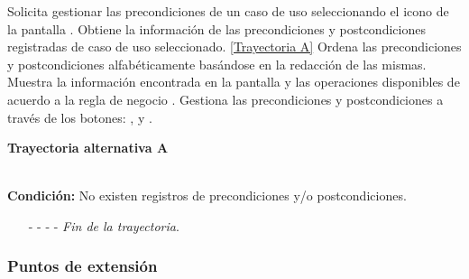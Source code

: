 \begin{UCtrayectoria}
	\UCpaso[\UCactor] Solicita gestionar las precondiciones de un caso de uso seleccionando el icono  de la pantalla .
	\UCpaso[\UCsist] Obtiene la información de las precondiciones y postcondiciones registradas de caso de uso seleccionado. \hyperlink{CU12-1-2:TAA}{[Trayectoria A]}
	\UCpaso[\UCsist] Ordena las precondiciones y postcondiciones alfabéticamente basándose en la redacción de las mismas.
	\UCpaso[\UCsist] Muestra la información encontrada en la pantalla  y las operaciones disponibles de acuerdo a la regla de negocio . \label{CU12-1-2-P4}
	\UCpaso[\UCactor] Gestiona las precondiciones y postcondiciones a través de los botones: , \editar y \eliminar. 
\end{UCtrayectoria}		
\hypertarget{CU12-1-2:TAA}{\textbf{Trayectoria alternativa A}}\\
\noindent \textbf{Condición:} No existen registros de precondiciones y/o postcondiciones.
\begin{enumerate}
	\UCpaso[\UCsist] Muestra el mensaje  en la pantalla  para indicar que no hay registros para mostrar.  \label{CU12-1-2-TA1}
	\UCpaso[\UCactor] Gestiona las precondiciones y postcondiciones a través del botón: . 
	\item[- -] - - {\em {Fin de la trayectoria}}.%
\end{enumerate}
\subsubsection{Puntos de extensión}

